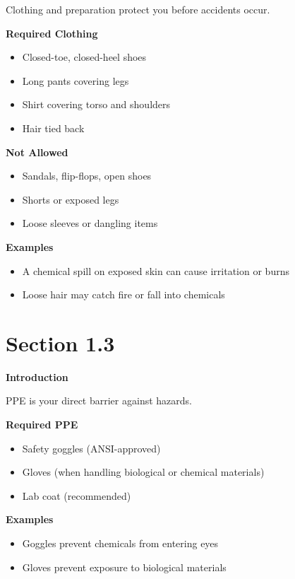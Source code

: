 \documentclass[
  letterpaper,
  DIV=11,
  numbers=noendperiod]{scrreprt}
\begin{document}
Clothing and preparation protect you before accidents occur.

\textbf{Required Clothing}

\begin{itemize}
\item
  Closed-toe, closed-heel shoes
\item
  Long pants covering legs
\item
  Shirt covering torso and shoulders
\item
  Hair tied back
\end{itemize}

\textbf{Not Allowed}

\begin{itemize}
\item
  Sandals, flip-flops, open shoes
\item
  Shorts or exposed legs
\item
  Loose sleeves or dangling items
\end{itemize}

\textbf{Examples}

\begin{itemize}
\item
  A chemical spill on exposed skin can cause irritation or burns
\item
  Loose hair may catch fire or fall into chemicals
\end{itemize}

\section{\texorpdfstring{\textbf{Section
1.3}}{Section 1.3}}\label{section-1.3}

\textbf{Introduction}

PPE is your direct barrier against hazards.

\textbf{Required PPE}

\begin{itemize}
\item
  Safety goggles (ANSI-approved)
\item
  Gloves (when handling biological or chemical materials)
\item
  Lab coat (recommended)
\end{itemize}

\textbf{Examples}

\begin{itemize}
\item
  Goggles prevent chemicals from entering eyes
\item
  Gloves prevent exposure to biological materials
\end{itemize}
\end{document}
